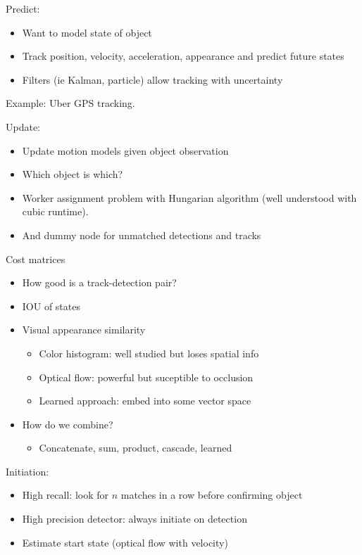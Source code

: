 \documentclass{article}
\begin{document}
Predict:
\begin{itemize}
  \item Want to model state of object 
  \item Track position, velocity, acceleration, appearance and predict future states
  \item Filters (ie Kalman, particle) allow tracking with uncertainty
\end{itemize}

Example: Uber GPS tracking.

Update:
\begin{itemize}
  \item Update motion models given object observation
  \item Which object is which?
  \item Worker assignment problem with Hungarian algorithm (well understood with cubic runtime).
  \item And dummy node for unmatched detections and tracks
\end{itemize}

Cost matrices
\begin{itemize}
  \item How good is a track-detection pair?
  \item IOU of states
  \item Visual appearance similarity
    \begin{itemize}
      \item Color histogram: well studied but loses spatial info
      \item Optical flow: powerful but suceptible to occlusion
      \item Learned approach: embed into some vector space
    \end{itemize}
  \item How do we combine?
    \begin{itemize}
      \item Concatenate, sum, product, cascade, learned
    \end{itemize}
\end{itemize}

Initiation:
\begin{itemize}
  \item High recall: look for $n$ matches in a row before confirming object
  \item High precision detector: always initiate on detection
  \item Estimate start state (optical flow with velocity)
\end{itemize}
\end{document}
